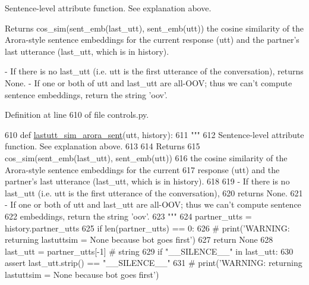 \begin{DoxyVerb}Sentence-level attribute function. See explanation above.

Returns
  cos_sim(sent_emb(last_utt), sent_emb(utt))
the cosine similarity of the Arora-style sentence embeddings for the current
response (utt) and the partner's last utterance (last_utt, which is in history).

- If there is no last_utt (i.e. utt is the first utterance of the conversation),
  returns None.
- If one or both of utt and last_utt are all-OOV; thus we can't compute sentence
  embeddings, return the string 'oov'.
\end{DoxyVerb}
 

Definition at line 610 of file controls.\+py.


\begin{DoxyCode}
610 \textcolor{keyword}{def }\hyperlink{namespaceprojects_1_1controllable__dialogue_1_1controllable__seq2seq_1_1controls_af87f0a728f9bbb385f160b47ca033c31}{lastutt\_sim\_arora\_sent}(utt, history):
611     \textcolor{stringliteral}{"""}
612 \textcolor{stringliteral}{    Sentence-level attribute function. See explanation above.}
613 \textcolor{stringliteral}{}
614 \textcolor{stringliteral}{    Returns}
615 \textcolor{stringliteral}{      cos\_sim(sent\_emb(last\_utt), sent\_emb(utt))}
616 \textcolor{stringliteral}{    the cosine similarity of the Arora-style sentence embeddings for the current}
617 \textcolor{stringliteral}{    response (utt) and the partner's last utterance (last\_utt, which is in history).}
618 \textcolor{stringliteral}{}
619 \textcolor{stringliteral}{    - If there is no last\_utt (i.e. utt is the first utterance of the conversation),}
620 \textcolor{stringliteral}{      returns None.}
621 \textcolor{stringliteral}{    - If one or both of utt and last\_utt are all-OOV; thus we can't compute sentence}
622 \textcolor{stringliteral}{      embeddings, return the string 'oov'.}
623 \textcolor{stringliteral}{    """}
624     partner\_utts = history.partner\_utts
625     \textcolor{keywordflow}{if} len(partner\_utts) == 0:
626         \textcolor{comment}{# print('WARNING: returning lastuttsim = None because bot goes first')}
627         \textcolor{keywordflow}{return} \textcolor{keywordtype}{None}
628     last\_utt = partner\_utts[-1]  \textcolor{comment}{# string}
629     \textcolor{keywordflow}{if} \textcolor{stringliteral}{"\_\_SILENCE\_\_"} \textcolor{keywordflow}{in} last\_utt:
630         \textcolor{keyword}{assert} last\_utt.strip() == \textcolor{stringliteral}{"\_\_SILENCE\_\_"}
631         \textcolor{comment}{# print('WARNING: returning lastuttsim = None because bot goes first')}

\end{DoxyCode}
